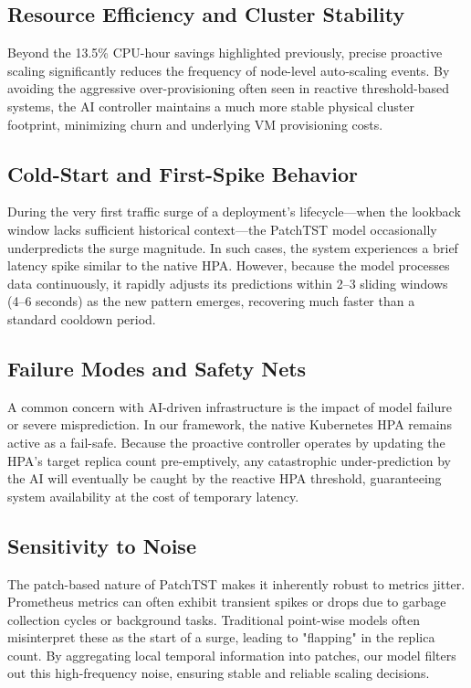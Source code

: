 \documentclass[conference]{IEEEtran}
\begin{document}
\subsection{Resource Efficiency and Cluster Stability}
Beyond the 13.5\% CPU-hour savings highlighted previously, precise proactive scaling significantly reduces the frequency of node-level auto-scaling events. By avoiding the aggressive over-provisioning often seen in reactive threshold-based systems, the AI controller maintains a much more stable physical cluster footprint, minimizing churn and underlying VM provisioning costs.

\subsection{Cold-Start and First-Spike Behavior}
During the very first traffic surge of a deployment's lifecycle—when the lookback window lacks sufficient historical context—the PatchTST model occasionally underpredicts the surge magnitude. In such cases, the system experiences a brief latency spike similar to the native HPA. However, because the model processes data continuously, it rapidly adjusts its predictions within 2--3 sliding windows (4--6 seconds) as the new pattern emerges, recovering much faster than a standard cooldown period.

\subsection{Failure Modes and Safety Nets}
A common concern with AI-driven infrastructure is the impact of model failure or severe misprediction. In our framework, the native Kubernetes HPA remains active as a fail-safe. Because the proactive controller operates by updating the HPA's target replica count pre-emptively, any catastrophic under-prediction by the AI will eventually be caught by the reactive HPA threshold, guaranteeing system availability at the cost of temporary latency.

\subsection{Sensitivity to Noise}
The patch-based nature of PatchTST makes it inherently robust to metrics jitter. Prometheus metrics can often exhibit transient spikes or drops due to garbage collection cycles or background tasks. Traditional point-wise models often misinterpret these as the start of a surge, leading to "flapping" in the replica count. By aggregating local temporal information into patches, our model filters out this high-frequency noise, ensuring stable and reliable scaling decisions.
\end{document}
